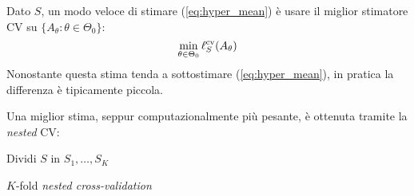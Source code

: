 Dato $S$, un modo veloce di stimare (\ref{eq:hyper_mean}) è usare il miglior
stimatore CV su $\{A_\theta:\theta\in\Theta_0\}$:
$$ \min_{\theta\in\Theta_0}\ell_S^{\text{cv}}(A_\theta) $$
Nonostante questa stima tenda a sottostimare (\ref{eq:hyper_mean}), in pratica
la differenza è tipicamente piccola.

Una miglior stima, seppur computazionalmente più pesante, è ottenuta tramite
la \textit{nested} CV:

\begin{algorithm}[h]
    \DontPrintSemicolon
    Dividi $S$ in $S_1,\dots,S_K$\;
    \caption{$K$-fold \textit{nested cross-validation}}
\end{algorithm}